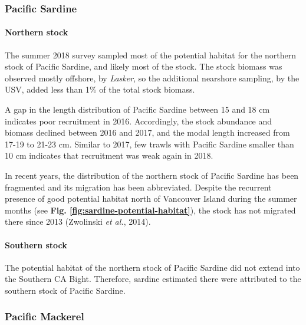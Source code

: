 \documentclass[]{article}
\let\oldparagraph\paragraph
\renewcommand{\paragraph}[1]{\oldparagraph{#1}\mbox{}}
\begin{document}
\hypertarget{discussion-sardine}{%
\subsubsection{Pacific Sardine}\label{discussion-sardine}}

\hypertarget{discussion-sardine-biomass-northern}{%
\paragraph{Northern stock}\label{discussion-sardine-biomass-northern}}

The summer 2018 survey sampled most of the potential habitat for the northern stock of Pacific Sardine, and likely most of the stock. The stock biomass was observed mostly offshore, by \emph{Lasker}, so the additional nearshore sampling, by the USV, added less than 1\% of the total stock biomass.

A gap in the length distribution of Pacific Sardine between 15 and 18 cm indicates poor recruitment in 2016. Accordingly, the stock abundance and biomass declined between 2016 and 2017, and the modal length increased from 17-19 to 21-23 cm. Similar to 2017, few trawls with Pacific Sardine smaller than 10 cm indicates that recruitment was weak again in 2018.

In recent years, the distribution of the northern stock of Pacific Sardine has been fragmented and its migration has been abbreviated. Despite the recurrent presence of good potential habitat north of Vancouver Island during the summer months (see \textbf{Fig. \ref{fig:sardine-potential-habitat}}), the stock has not migrated there since 2013 (Zwolinski \emph{et al.}, 2014).

\hypertarget{discussion-sardine-biomass-southern}{%
\paragraph{Southern stock}\label{discussion-sardine-biomass-southern}}

The potential habitat of the northern stock of Pacific Sardine did not extend into the Southern CA Bight. Therefore, sardine estimated there were attributed to the southern stock of Pacific Sardine.

\hypertarget{discussion-mack}{%
\subsubsection{Pacific Mackerel}\label{discussion-mack}}
\end{document}

